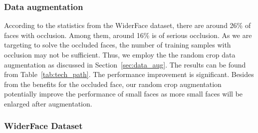 \documentclass[10pt,twocolumn,letterpaper]{article}
\begin{document}
\begin{table*}[htbp]
\begin{center}
\end{center}
\caption{The ablation study of FAN on the WiderFace validation set.}
\label{tab:tech_path}
\end{table*}

\subsubsection{Data augmentation} 

According to the statistics from the WiderFace dataset, there are around 26\% of faces with occlusion. Among them, around 16\% is of serious occlusion. As we are targeting to solve the occluded faces, the number of training samples with occlusion may not be sufficient. Thus, we employ the the random crop data augmentation as discussed in Section~\ref{sec:data_aug}. The results can be found from Table~\ref{tab:tech_path}. The performance improvement is significant. Besides from the benefits for the occluded face, our random crop augmentation potentially improve the performance of small faces as more small faces will be enlarged after augmentation.

\subsubsection{WiderFace Dataset}
\end{document}
